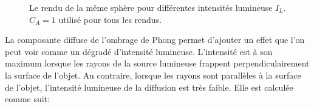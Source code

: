 \documentclass[11pt]{article}
\begin{document}
\begin{figure}[h!]

	\caption{Le rendu de la même sphère pour différentes intensités lumineuse $I_L$. $C_A = 1$ utilisé pour tous les rendus.}
	\label{differentAmbient}
\end{figure}
\FloatBarrier

La composante diffuse de l'ombrage de Phong permet d'ajouter un effet que l'on peut voir comme un dégradé d'intensité lumineuse. L'intensité est à son maximum lorsque les rayons de la source lumineuse frappent perpendiculairement la surface de l'objet. Au contraire, lorsque les rayons sont parallèles à la surface de l'objet, l'intensité lumineuse de la diffusion est très faible. Elle est calculée comme suit:\\
\end{document}
